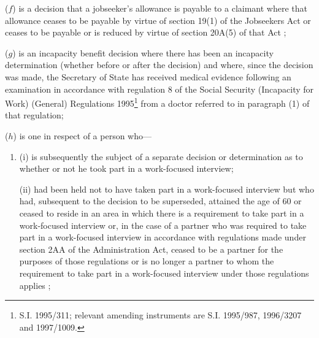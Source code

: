 \documentclass[12pt,a4paper]{article}
\begin{document}
\begin{enumerate}

($f$) is a decision that a jobseeker’s allowance is payable to a claimant where that allowance ceases to be payable by virtue of section 19(1) of the Jobseekers Act
or ceases to be payable or is reduced by virtue of section 20A(5) of that Act%
;

($g$) is an incapacity benefit decision where there has been an incapacity determination (whether before or after the decision) and where, since the decision was made, the Secretary of State has received medical evidence following an examination in accordance with regulation 8 of the Social Security (Incapacity for Work) (General) Regulations 1995\footnote{\frenchspacing S.I. 1995/311; relevant amending instruments are S.I. 1995/987, 1996/3207 and 1997/1009.} from a doctor referred to in paragraph (1) of that regulation;

($h$) is one in respect of a person who—
\begin{enumerate}\item[]
(i) is subsequently the subject of a separate decision or determination as to whether or not he took part in a work-focused interview;

(ii) had been held not to have taken part in a work-focused interview but who had, subsequent to the decision to be superseded, attained the age of 60 or ceased to reside in an area in which there is a requirement to take part in a work-focused interview
or, in the case of a partner who was required to take part in a work-focused interview 
in accordance with regulations made under section 2AA of the Administration Act, ceased to be a partner for the purposes of those regulations or is no longer a partner to whom the requirement to take part in a work-focused interview under those regulations applies%
;
\end{enumerate}


\end{enumerate}
\end{document}
